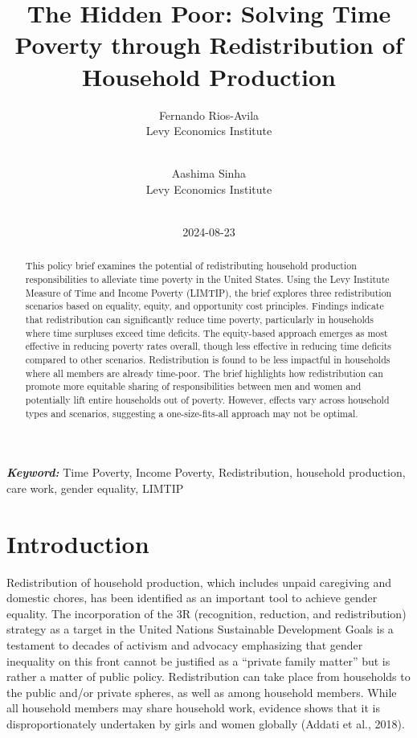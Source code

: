 \documentclass[
  11pt,
]{article}
\title{The Hidden Poor: Solving Time Poverty through Redistribution of
Household Production}
\author{
Fernando Rios-Avila\\
Levy Economics Institute\\
\\
\and 
Aashima Sinha\\
Levy Economics Institute\\
\\
}
\date{2024-08-23}
\begin{document}
\def\spacingset#1{\renewcommand{\baselinestretch}%
{#1}\small\normalsize} \spacingset{1}


\maketitle
\begin{abstract}
This policy brief examines the potential of redistributing household
production responsibilities to alleviate time poverty in the United
States. Using the Levy Institute Measure of Time and Income Poverty
(LIMTIP), the brief explores three redistribution scenarios based on
equality, equity, and opportunity cost principles. Findings indicate
that redistribution can significantly reduce time poverty, particularly
in households where time surpluses exceed time deficits. The
equity-based approach emerges as most effective in reducing poverty
rates overall, though less effective in reducing time deficits compared
to other scenarios. Redistribution is found to be less impactful in
households where all members are already time-poor. The brief highlights
how redistribution can promote more equitable sharing of
responsibilities between men and women and potentially lift entire
households out of poverty. However, effects vary across household types
and scenarios, suggesting a one-size-fits-all approach may not be
optimal.
\end{abstract}
 
\vspace{.2in}

\textbf{\textit{Keyword: }}Time Poverty, Income Poverty, Redistribution,
household production, care work, gender equality, LIMTIP


\thispagestyle{empty}
\clearpage{}
\newpage
\spacingset{1.2} %
\section{Introduction}\label{introduction}

Redistribution of household production, which includes unpaid caregiving
and domestic chores, has been identified as an important tool to achieve
gender equality. The incorporation of the 3R (recognition, reduction,
and redistribution) strategy as a target in the United Nations
Sustainable Development Goals is a testament to decades of activism and
advocacy emphasizing that gender inequality on this front cannot be
justified as a ``private family matter'' but is rather a matter of
public policy. Redistribution can take place from households to the
public and/or private spheres, as well as among household members. While
all household members may share household work, evidence shows that it
is disproportionately undertaken by girls and women globally (Addati et
al., 2018).
\end{document}
